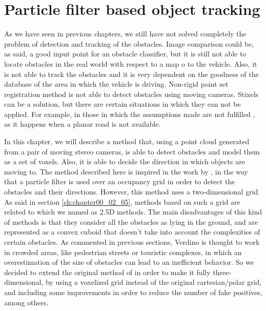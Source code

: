 
\graphicspath{{./images/chapter05/bmps/}{./images/chapter05/vects/}{./images/chapter05/}}

\chapter{Particle filter based object tracking}\label{ch:chapter05}

As we have seen in previous chapters, we still have not solved completely the problem of detection and tracking of the obstacles. Image comparison could be, as said, a good input point for an obstacle classifier, but it is still not able to locate obstacles in the real world with respect to a map o to the vehicle. Also, it is not able to track the obstacles and it is very dependent on the goodness of the database of the area in which the vehicle is driving. Non-rigid point set registration method is not able to detect obstacles using moving cameras. Stixels can be a solution, but there are certain situations in which they can not be applied. For example, in those in which the assumptions made are not fulfilled , as it happens when a planar road is not available.

In this chapter, we will describe a method that, using a point cloud generated from a pair of moving stereo cameras, is able to detect obstacles and model them as a set of voxels. Also, it is able to decide the direction in which objects are moving to. The method described here is inspired in the work by \cite{danescu2012particle}, in the way that a particle filter is used over an occupancy grid in order to detect the obstacles and their directions. However, this method uses a two-dimensional grid. As said in section \ref{ch:chapter00_02_05}, methods based on such a grid are related to which we named as 2.5D methods. The main disadvantages of this kind of methods is that they consider all the obstacles as lying in the ground, and are represented as a convex cuboid that doesn't take into account the complexities of certain obstacles.
As commented in previous sections, Verdino is thought to work in crowded areas, like pedestrian streets or touristic complexes, in which an overestimation of the size of obstacles can lead to an inefficient behavior. So we decided to extend the original method of \cite{danescu2012particle} in order to make it fully three-dimensional, by using a voxelized grid instead of the original cartesian/polar grid, and including some improvements in order to reduce the number of fake positives, among others.

